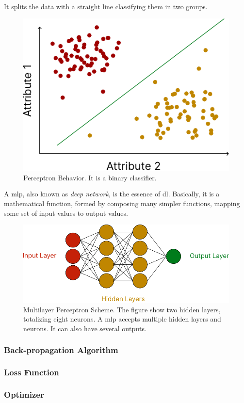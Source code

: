It splits the data with a straight line classifying them in two groups.

\begin{figure}[H]
    \centering
    \includegraphics{figures/2methodology/nn/perceptron_charge.pdf}
    \caption[Perceptron Behavior]{Perceptron Behavior. It is a binary classifier.}
\end{figure}
 
A \gls*{mlp}, also known as \emph{deep network}, is the essence of \gls*{dl}. Basically, it is a mathematical function, formed by composing many simpler functions, mapping some set of input values to output values.
%
\begin{figure}[H]
    \centering
    \includegraphics{figures/2methodology/nn/mlp.pdf}
    \caption[Multilayer Perceptron Scheme]{Multilayer Perceptron Scheme. The figure show two hidden layers, totalizing eight neurons. A \gls*{mlp} accepts multiple hidden layers and neurons. It can also have several outputs.}
\end{figure}

\subsubsection*{Back-propagation Algorithm}

\subsubsection*{Loss Function}

\subsubsection*{Optimizer}